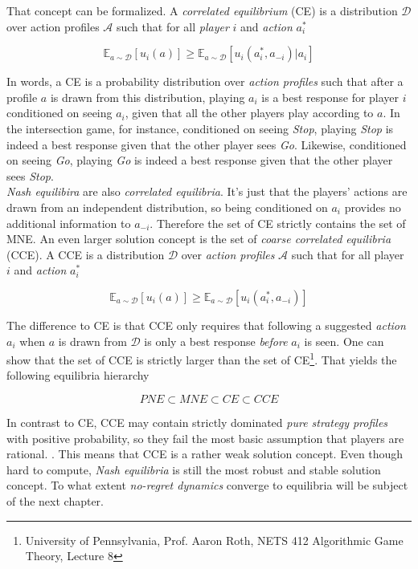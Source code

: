 That concept can be formalized. A \textit{correlated equilibrium} (CE) is a distribution $\mathcal{D}$ over action profiles $\mathcal{A}$ such that for all \textit{player} $i$ and \textit{action} $a_{i}^{*}$

\begin{equation*}
    \mathbb{E}_{a \sim \mathcal{D}}[u_i(a)] \ge \mathbb{E}_{a \sim \mathcal{D}}[u_i(a_{i}^{*},a_{-i})|a_i]
\end{equation*}

In words, a CE is a probability distribution over \textit{action profiles} such that after a profile $a$ is drawn from this distribution, playing $a_i$ is a best response for player $i$ conditioned on seeing $a_i$, given that all the other players play according to $a$. In the intersection game, for instance, conditioned on seeing \textit{Stop}, playing \textit{Stop} is indeed a best response given that the other player sees \textit{Go}. Likewise, conditioned on seeing \textit{Go}, playing \textit{Go} is indeed a best response given that the other player sees \textit{Stop}. \\

\textit{Nash equilibira} are also \textit{correlated equilibria}. It's just that the players' actions are drawn from an independent distribution, so being conditioned on $a_i$ provides no additional information to $a_{-i}$. Therefore the set of CE strictly contains the set of MNE. An even larger solution concept is the set of \textit{coarse correlated equilibria} (CCE). A CCE is a distribution $\mathcal{D}$ over \textit{action profiles} $\mathcal{A}$ such that for all player $i$ and \textit{action} $a_{i}^{*}$

\begin{equation*}
    \mathbb{E}_{a \sim \mathcal{D}}[u_i(a)] \ge \mathbb{E}_{a \sim \mathcal{D}}[u_i(a_{i}^{*},a_{-i})]
\end{equation*}

The difference to CE is that CCE only requires that following a suggested \textit{action} $a_i$ when $a$ is drawn from $\mathcal{D}$ is only a best response \textit{before} $a_i$ is seen. One can show that the set of CCE is strictly larger than the set of CE\footnote{University of Pennsylvania, Prof. Aaron Roth, NETS 412 Algorithmic Game Theory, Lecture 8}. That yields the following equilibria hierarchy

\begin{equation*}
    PNE \subset MNE \subset CE \subset CCE
\end{equation*}

In contrast to CE, CCE may contain strictly dominated \textit{pure strategy profiles} with positive probability, so they fail the most basic assumption that players are rational. \cite{viossat}. This means that CCE is a rather weak solution concept. Even though hard to compute, \textit{Nash equilibria} is still the most robust and stable solution concept. To what extent \textit{no-regret dynamics} converge to equilibria will be subject of the next chapter. 



